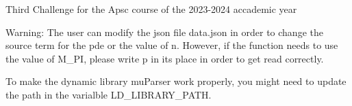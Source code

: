 Third Challenge for the Apsc course of the 2023-\/2024 accademic year

Warning\+: The user can modify the json file data.\+json in order to change the source term for the pde or the value of n. However, if the function needs to use the value of M\+\_\+\+PI, please write p in its place in order to get read correctly.

To make the dynamic library mu\+Parser work properly, you might need to update the path in the varialble LD\+\_\+\+LIBRARY\+\_\+\+PATH. 